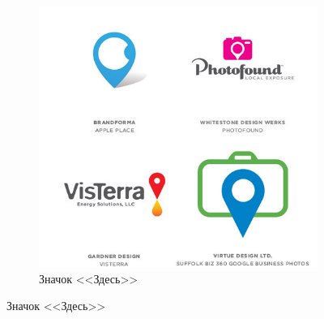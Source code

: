 \begin{figure}[h!]
  \vfill

  \centering
  \begin{subfigure}{.45\textwidth}
    \centering
    \includegraphics[width=\linewidth]{images/supplement/logolounge/2013/Znachok-zdes}
    \caption[]{Значок <<Здесь>>}
    \label{fig:logolounge:2013:znachok-zdes}
  \end{subfigure}
\end{figure}
